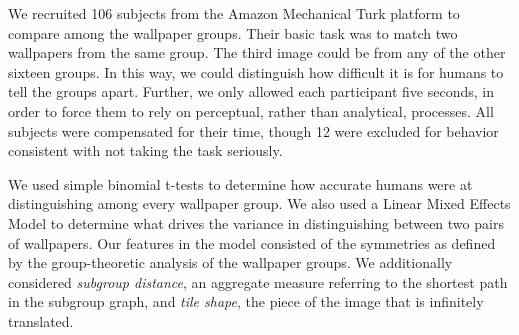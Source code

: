 We recruited 106 subjects from the Amazon Mechanical Turk platform to compare among the wallpaper groups. Their basic task was to match two wallpapers from the same group. The third image could be from any of the other sixteen groups. In this way, we could distinguish how difficult it is for humans to tell the groups apart. Further, we only allowed each participant five seconds, in order to force them to rely on perceptual, rather than analytical, processes. All subjects were compensated for their time, though 12 were excluded for behavior consistent with not taking the task seriously. \linebreak 

We used simple binomial t-tests to determine how accurate humans were at distinguishing among every wallpaper group. We also used a Linear Mixed Effects Model to determine what drives the variance in distinguishing between two pairs of wallpapers. Our features in the model consisted of the symmetries as defined by the group-theoretic analysis of the wallpaper groups. We additionally considered \textit{subgroup distance}, an aggregate measure referring to the shortest path in the subgroup graph, and \textit{tile shape}, the piece of the image that is infinitely translated.